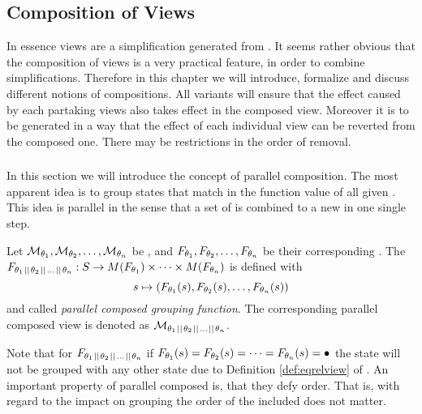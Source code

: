 \documentclass[preview]{standalone}
\begin{document}
\subsection{Composition of Views} \label{ch:composition}
In essence views are a simplification generated from \chgphN. It seems rather obvious that the composition of views is a very practical feature, in order to combine simplifications. Therefore in this chapter we will introduce, formalize and discuss different notions of compositions. All variants will ensure that the effect caused by each partaking views also takes effect in the composed view. Moreover it is to be generated in a way that the effect of each individual view can be reverted from the composed one. There may be restrictions in the order of removal.

\subsubsection{\parllcompNCC} 
In this section we will introduce the concept of parallel composition. The most apparent idea is to group states that match in the function value of all given \grpfctsN. This idea is parallel in the sense that a set of \grpfctN is combined to a new \grpfctN in one single step.

\begin{definition} \label{def:pllcompviewandgfct}
	Let $\view[\viewppty_1], \view[\viewppty_2], \dots, \view[\viewppty_n]$ be \viewsN, and $\grpfct[\viewppty_1], \grpfct[\viewppty_2], \dots, \grpfct[\viewppty_n]$ be their corresponding \grpfctsN. The \grpfctN $\grpfct[{\viewppty_1 \pll \viewppty_2 \pll \dots \pll \viewppty_n}]: \states \to \arbset(\grpfct[\viewppty_1]) \times \dots \times \arbset(\grpfct[\viewppty_n])$ is defined with
	\[
	\state \mapsto (\grpfct[\viewppty_1](\state), \grpfct[\viewppty_2](\state), \dots, \grpfct[\viewppty_n](\state))
	\] 
	and called \emph{parallel composed grouping function}.
	The corresponding parallel composed view is denoted as $\view[\viewppty_1 \pll \viewppty_2 \pll \dots \pll \viewppty_n]$.
\end{definition}

Note that for $\grpfct[{\viewppty_1 \pll \viewppty_2 \pll \dots \pll \viewppty_n}]$ if $\grpfct[\viewppty_1](\state) = \grpfct[\viewppty_2](\state) = \dots = \grpfct[\viewppty_n](\state) = \remelem$ the state \state will not be grouped with any other state due to Definition \ref{def:eqrelview} of \eqrelview. An important property of parallel composed \grpfctsN is, that they defy order. That is, with regard to the impact on grouping the order of the included \grpfctsN does not matter.
\end{document}
